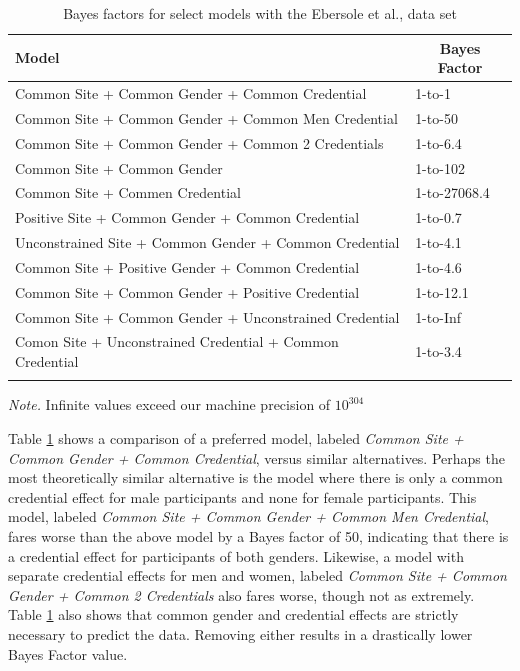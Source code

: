 \documentclass[english,man]{apa6}
\theoremstyle{definition}
\theoremstyle{definition}
\theoremstyle{definition}
\theoremstyle{remark}
\begin{document}
\begin{table}[tbp]
\begin{center}
\begin{threeparttable}
\caption{\label{tab:ml3BF}Bayes factors for select models with the Ebersole et al., data set}
\begin{tabular}{ll}
\toprule
Model & \multicolumn{1}{c}{Bayes Factor}\\
\midrule
Common Site + Common Gender + Common Credential & 1-to-1\\
Common Site + Common Gender + Common Men Credential & 1-to-50\\
Common Site + Common Gender + Common 2 Credentials & 1-to-6.4\\
Common Site + Common Gender & 1-to-102\\
Common Site + Commen Credential & 1-to-27068.4\\
Positive Site + Common Gender + Common Credential & 1-to-0.7\\
Unconstrained Site + Common Gender + Common Credential & 1-to-4.1\\
Common Site + Positive Gender + Common Credential & 1-to-4.6\\
Common Site + Common Gender + Positive Credential & 1-to-12.1\\
Common Site + Common Gender + Unconstrained Credential & 1-to-Inf\\
Comon Site + Unconstrained Credential + Common Credential & 1-to-3.4\\
\bottomrule
\addlinespace
\end{tabular}
\begin{tablenotes}[para]
\textit{Note.} Infinite values exceed our machine precision of $10^304$
\end{tablenotes}
\end{threeparttable}
\end{center}
\end{table}

Table \ref{tab:ml3BF} shows a comparison of a preferred model, labeled
\emph{Common Site + Common Gender + Common Credential}, versus similar
alternatives. Perhaps the most theoretically similar alternative is the
model where there is only a common credential effect for male
participants and none for female participants. This model, labeled
\emph{Common Site + Common Gender + Common Men Credential}, fares worse
than the above model by a Bayes factor of 50, indicating that there is a
credential effect for participants of both genders. Likewise, a model
with separate credential effects for men and women, labeled \emph{Common
Site + Common Gender + Common 2 Credentials} also fares worse, though
not as extremely. Table \ref{tab:ml3BF} also shows that common gender
and credential effects are strictly necessary to predict the data.
Removing either results in a drastically lower Bayes Factor value.
\end{document}

